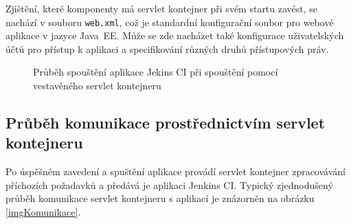             Zjištění, které komponenty má servlet kontejner při svém startu zavést,
            se nachází v souboru \texttt{web.xml}, což je standardní konfigurační soubor
            pro webové aplikace v jazyce Java~EE. Může se zde nacházet také
            konfigurace uživatelských účtů pro přístup k aplikaci a specifikování
            různých druhů přístupových práv.


            \begin{figure}[h!t]
                \begin{center}
                    \caption{Průběh spouštění aplikace Jekins CI při spouštění pomocí vestavěného servlet kontejneru}
                    \label{imgArchitekturaSpusteni}
                \end{center}
            \end{figure}


        \subsection{Průběh komunikace prostřednictvím servlet kontejneru}
            Po úspěšném zavedení a spuštění aplikace provádí servlet kontejner
            zpracovávání příchozích požadavků a předává je aplikaci Jenkins CI. 
            Typický zjednodušený průběh komunikace servlet kontejneru s aplikací je znázorněn
            na obrázku \ref{imgKomunikace}. 

